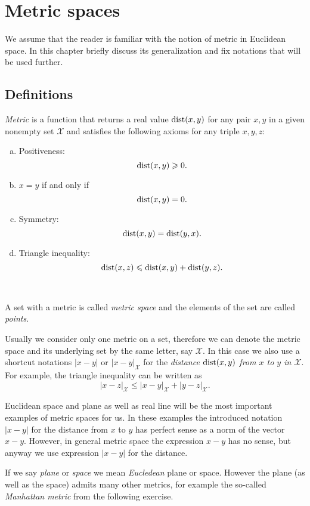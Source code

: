 \chapter{Metric spaces}\label{app:metric-spcaes}

We assume that the reader is familiar with the notion of metric in 
Euclidean space.
In this chapter briefly discuss its generalization and fix notations that will be used further.

\section*{Definitions}

\emph{Metric} is a function that returns a real value $\mathop{\rm dist}\nolimits(x,y)$ for any pair $x,y$ in a given nonempty set $\mathcal X$  and satisfies the following axioms for any triple $x,y,z$: \label{page:def:metric}
\begin{enumerate}[(a)]
\item\label{def:metric-space:a} Positiveness: 
$$\mathop{\rm dist}\nolimits(x,y)\geqslant 0.$$
\item\label{def:metric-space:b} $x=y$ if and only if 
$$\mathop{\rm dist}\nolimits(x,y)=0.$$
\item\label{def:metric-space:c} Symmetry: $$\mathop{\rm dist}\nolimits(x, y) = \mathop{\rm dist}\nolimits(y, x).$$
\item\label{def:metric-space:d} Triangle inequality: 
$$\mathop{\rm dist}\nolimits(x, z) \leqslant \mathop{\rm dist}\nolimits(x, y) + \mathop{\rm dist}\nolimits(y, z).$$
\end{enumerate}\

A set with a metric is called \emph{metric space} and the elements of the set are called \emph{points}.

Usually we consider only one metric on a set, therefore we can denote the metric space and its underlying set by the same letter, say $\mathcal X$.
In this case we also use a shortcut notations $|x-y|$ or  $|x-y|_\mathcal X$ for the \emph{distance $\mathop{\rm dist}\nolimits(x,y)$ from $x$ to $y$ in $\mathcal X$}.
For example, the triangle inequality can be written as 
$$|x-z|_{\mathcal X}\le |x-y|_{\mathcal X}+|y-z|_{\mathcal X}.$$

Euclidean space and plane as well as real line will be the most important examples of metric spaces for us.
In these examples the introduced notation $|x-y|$ for the distance from $x$ to $y$ has perfect sense as a norm of the vector $x-y$.
However, in general metric space the expression $x-y$ has no sense, but anyway we use expression $|x-y|$ for the distance.

If we say \emph{plane} or \emph{space} we mean \emph{Eucledean} plane or space.
However the plane (as well as the space) admits many other metrics, for example the so-called \emph{Manhattan metric} from the following exercise.

